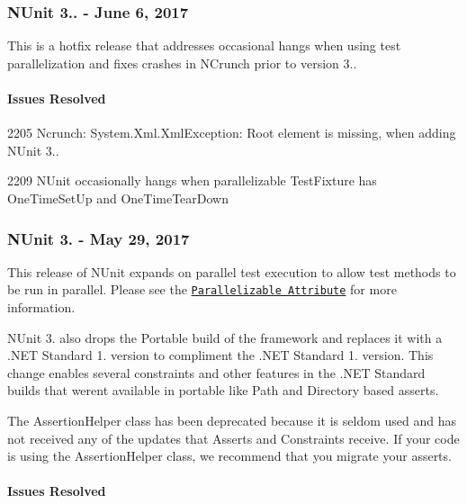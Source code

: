 \subsubsection*{N\+Unit 3.. -\/ June 6, 2017}

This is a hotfix release that addresses occasional hangs when using test parallelization and fixes crashes in N\+Crunch prior to version 3..

\paragraph*{Issues Resolved}


\begin{DoxyItemize}
\item 2205 Ncrunch\+: System.\+Xml.\+Xml\+Exception\+: Root element is missing, when adding N\+Unit 3..
\item 2209 N\+Unit occasionally hangs when parallelizable Test\+Fixture has One\+Time\+Set\+Up and One\+Time\+Tear\+Down
\end{DoxyItemize}

\subsubsection*{N\+Unit 3. -\/ May 29, 2017}

This release of N\+Unit expands on parallel test execution to allow test methods to be run in parallel. Please see the \href{https://github.com/nunit/docs/wiki/Parallelizable-Attribute}{\tt Parallelizable Attribute} for more information.

N\+Unit 3. also drops the Portable build of the framework and replaces it with a .N\+ET Standard 1. version to compliment the .N\+ET Standard 1. version. This change enables several constraints and other features in the .N\+ET Standard builds that weren\textquotesingle{}t available in portable like Path and Directory based asserts.

The Assertion\+Helper class has been deprecated because it is seldom used and has not received any of the updates that Asserts and Constraints receive. If your code is using the Assertion\+Helper class, we recommend that you migrate your asserts.

\paragraph*{Issues Resolved}



